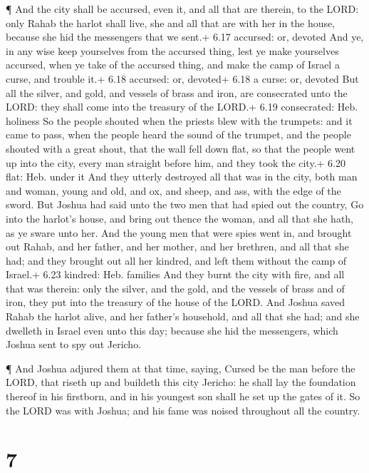  ¶ And the city shall be accursed, even it, and all that
are therein, to the LORD: only Rahab the harlot shall live, she and all
that are with her in the house, because she hid the messengers that we
sent.+ 6.17 accursed: or, devoted  And ye, in any wise keep
yourselves from the accursed thing, lest ye make yourselves accursed,
when ye take of the accursed thing, and make the camp of Israel a curse,
and trouble it.+ 6.18 accursed: or, devoted+ 6.18 a curse: or, devoted
 But all the silver, and gold, and vessels of brass and
iron, are consecrated unto the LORD: they shall come into the treasury
of the LORD.+ 6.19 consecrated: Heb. holiness  So the
people shouted when the priests blew with the trumpets: and it came to
pass, when the people heard the sound of the trumpet, and the people
shouted with a great shout, that the wall fell down flat, so that the
people went up into the city, every man straight before him, and they
took the city.+ 6.20 flat: Heb. under it  And they utterly
destroyed all that was in the city, both man and woman, young and old,
and ox, and sheep, and ass, with the edge of the sword. 
But Joshua had said unto the two men that had spied out the country, Go
into the harlot's house, and bring out thence the woman, and all that
she hath, as ye sware unto her.  And the young men that
were spies went in, and brought out Rahab, and her father, and her
mother, and her brethren, and all that she had; and they brought out all
her kindred, and left them without the camp of Israel.+ 6.23 kindred:
Heb. families  And they burnt the city with fire, and all
that was therein: only the silver, and the gold, and the vessels of
brass and of iron, they put into the treasury of the house of the LORD.
 And Joshua saved Rahab the harlot alive, and her father's
household, and all that she had; and she dwelleth in Israel even unto
this day; because she hid the messengers, which Joshua sent to spy out
Jericho.

 ¶ And Joshua adjured them at that time, saying, Cursed be
the man before the LORD, that riseth up and buildeth this city Jericho:
he shall lay the foundation thereof in his firstborn, and in his
youngest son shall he set up the gates of it.  So the LORD
was with Joshua; and his fame was noised throughout all the country.

\hypertarget{section-6}{%
\section{7}\label{section-6}}

